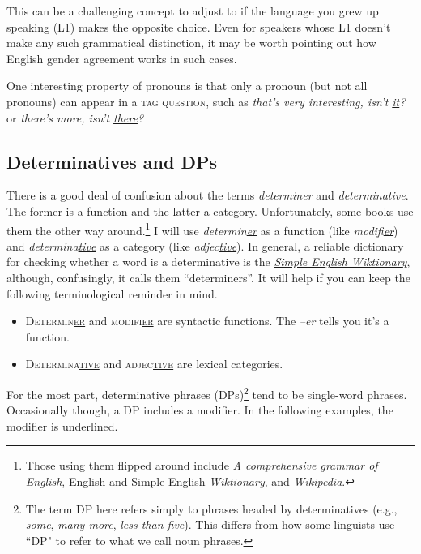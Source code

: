 This can be a challenging concept to adjust to if the language you grew up speaking (L1) makes the opposite choice. Even for speakers whose L1 doesn't make any such grammatical distinction, it may be worth pointing out how English gender agreement works in such cases.

One interesting property of pronouns is that only a pronoun (but not all pronouns) can appear in a \textsc{tag question}, such as \textit{that's very interesting, \ob isn't \uline{it}\cb?} or \textit{there's more, \ob isn't \uline{there}\cb?}

\subsection{Determinatives and DPs}\label{sec:DPs}

There is a good deal of confusion about the terms \textit{determiner} and \textit{determinative}. The former is a function and the latter a category. Unfortunately, some books use them the other way around.\footnote{Those using them flipped around include \textit{A comprehensive grammar of English}, English and Simple English \textit{Wiktionary}, and \textit{Wikipedia}.} I will use  \textit{determin\uline{er}} as a function (like  \textit{modifi\uline{er}}) and \textit{determina\uline{tive}} as a category (like \textit{adjec\uline{tive}}). In general, a reliable dictionary for checking whether a word is a determinative is the \href{https://simple.wiktionary.org/wiki/Category:Determiners}{\textit{Simple English Wiktionary}}, although, confusingly, it calls them ``determiners''. It will help if you can keep the following terminological reminder in mind.

\begin{itemize}[noitemsep]
    \item \textsc{Determin\uline{er}} and \textsc{modifi\uline{er}} are syntactic functions. The \textit{--er} tells you it's a function.
    \item \textsc{Determina\uline{tive}} and \textsc{adjec\uline{tive}} are lexical categories.
\end{itemize}

For the most part, determinative phrases (DPs)\footnote{The term DP here refers simply to phrases headed by determinatives (e.g., \textit{some}, \textit{many more}, \textit{less than five}). This differs from how some linguists use ``DP" to refer to what we call noun phrases.} tend to be single-word phrases. Occasionally though, a DP includes a modifier. In the following examples, the modifier is underlined.


